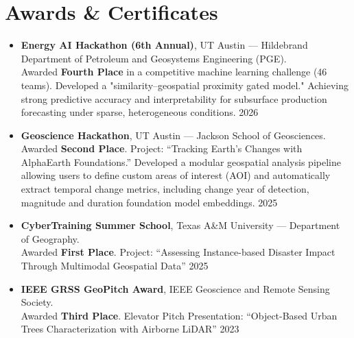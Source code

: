 \documentclass[a4paper,12pt]{article}
\makeatletter
\newenvironment{joblong}[2]
{
\begin{tabularx}{\linewidth}{@{}l X r@{}}
\textbf{#1} & \hfill &  #2 \\[3.75pt]
\end{tabularx}
\begin{minipage}[t]{\linewidth}
\begin{itemize}[nosep,after=\strut,leftmargin=1.2em,itemsep=3pt,label=--]
}
{
\end{itemize}
\end{minipage}
}
\makeatother
\begin{document}
\section{Awards \& Certificates}

\begin{itemize}[leftmargin=1.5em, itemsep=4pt, label=--]

    \item \textbf{Energy AI Hackathon (6th Annual)}, UT Austin — Hildebrand Department of Petroleum and Geosystems Engineering (PGE). \\
    Awarded \textbf{Fourth Place} in a competitive machine learning challenge (46 teams). 
    Developed a "similarity–geospatial proximity gated model." Achieving strong predictive accuracy and interpretability for subsurface production forecasting under sparse, heterogeneous conditions. \hfill 2026

    \item \textbf{Geoscience Hackathon}, UT Austin — Jackson School of Geosciences. \\
    Awarded \textbf{Second Place}. Project: ``Tracking Earth's Changes with AlphaEarth Foundations.'' Developed a modular geospatial analysis pipeline allowing users to define custom areas of interest (AOI) and automatically extract temporal change metrics, including change year of detection, magnitude and duration foundation model embeddings. \hfill 2025

    \item \textbf{CyberTraining Summer School}, Texas A\&M University — Department of Geography. \\
    Awarded \textbf{First Place}. Project: ``Assessing Instance-based Disaster Impact Through Multimodal Geospatial Data''  \hfill 2025

    \item \textbf{IEEE GRSS GeoPitch Award}, IEEE Geoscience and Remote Sensing Society. \\
    Awarded \textbf{Third Place}. Elevator Pitch Presentation: ``Object-Based Urban Trees Characterization with Airborne LiDAR'' \hfill 2023

\end{itemize}
\end{document}
